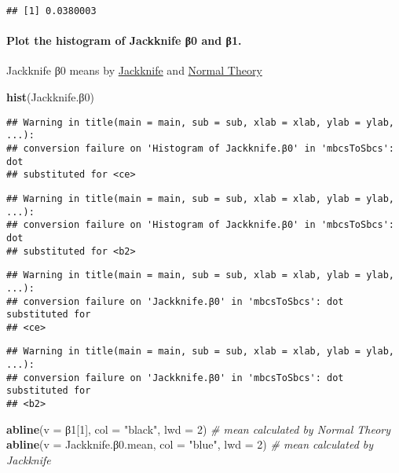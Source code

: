\documentclass[]{article}
\newenvironment{Shaded}{\begin{snugshade}}{\end{snugshade}}
\newcommand{\KeywordTok}[1]{\textcolor[rgb]{0.13,0.29,0.53}{\textbf{{#1}}}}
\newcommand{\DataTypeTok}[1]{\textcolor[rgb]{0.13,0.29,0.53}{{#1}}}
\newcommand{\DecValTok}[1]{\textcolor[rgb]{0.00,0.00,0.81}{{#1}}}
\newcommand{\FloatTok}[1]{\textcolor[rgb]{0.00,0.00,0.81}{{#1}}}
\newcommand{\StringTok}[1]{\textcolor[rgb]{0.31,0.60,0.02}{{#1}}}
\newcommand{\CommentTok}[1]{\textcolor[rgb]{0.56,0.35,0.01}{\textit{{#1}}}}
\newcommand{\NormalTok}[1]{{#1}}
\let\oldparagraph\paragraph
\renewcommand{\paragraph}[1]{\oldparagraph{#1}\mbox{}}
\begin{document}
\begin{verbatim}
## [1] 0.0380003
\end{verbatim}

\paragraph{Plot the histogram of Jackknife β0 and
β1.}\label{plot-the-histogram-of-jackknife-0-and-1.}

Jackknife β0 means by \href{blue}{Jackknife} and \href{black}{Normal
Theory}

\begin{Shaded}
\begin{Highlighting}[]
\KeywordTok{hist}\NormalTok{(Jackknife.β}\DecValTok{0}\NormalTok{)}
\end{Highlighting}
\end{Shaded}

\begin{verbatim}
## Warning in title(main = main, sub = sub, xlab = xlab, ylab = ylab, ...):
## conversion failure on 'Histogram of Jackknife.β0' in 'mbcsToSbcs': dot
## substituted for <ce>
\end{verbatim}

\begin{verbatim}
## Warning in title(main = main, sub = sub, xlab = xlab, ylab = ylab, ...):
## conversion failure on 'Histogram of Jackknife.β0' in 'mbcsToSbcs': dot
## substituted for <b2>
\end{verbatim}

\begin{verbatim}
## Warning in title(main = main, sub = sub, xlab = xlab, ylab = ylab, ...):
## conversion failure on 'Jackknife.β0' in 'mbcsToSbcs': dot substituted for
## <ce>
\end{verbatim}

\begin{verbatim}
## Warning in title(main = main, sub = sub, xlab = xlab, ylab = ylab, ...):
## conversion failure on 'Jackknife.β0' in 'mbcsToSbcs': dot substituted for
## <b2>
\end{verbatim}

\begin{Shaded}
\begin{Highlighting}[]
\KeywordTok{abline}\NormalTok{(}\DataTypeTok{v =} \NormalTok{β}\DecValTok{1}\NormalTok{[}\DecValTok{1}\NormalTok{], }\DataTypeTok{col =} \StringTok{"black"}\NormalTok{, }\DataTypeTok{lwd =} \DecValTok{2}\NormalTok{) }\CommentTok{# mean calculated by Normal Theory}
\KeywordTok{abline}\NormalTok{(}\DataTypeTok{v =} \NormalTok{Jackknife.β}\FloatTok{0.}\NormalTok{mean, }\DataTypeTok{col =} \StringTok{"blue"}\NormalTok{, }\DataTypeTok{lwd =} \DecValTok{2}\NormalTok{) }\CommentTok{# mean calculated by Jackknife}
\end{Highlighting}
\end{Shaded}
\end{document}
